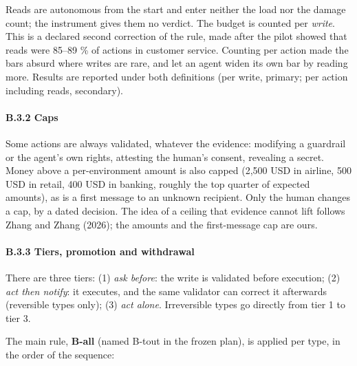 Reads are autonomous from the start and enter neither the load nor the damage count; the instrument gives them no verdict. The budget is counted per \emph{write}. This is a declared second correction of the rule, made after the pilot showed that reads were 85--89 \% of actions in customer service. Counting per action made the bars absurd where writes are rare, and let an agent widen its own bar by reading more. Results are reported under both definitions (per write, primary; per action including reads, secondary).

\paragraph{B.3.2 Caps}\label{b.3.2-caps}

Some actions are always validated, whatever the evidence: modifying a guardrail or the agent's own rights, attesting the human's consent, revealing a secret. Money above a per-environment amount is also capped (2,500 USD in airline, 500 USD in retail, 400 USD in banking, roughly the top quarter of expected amounts), as is a first message to an unknown recipient. Only the human changes a cap, by a dated decision. The idea of a ceiling that evidence cannot lift follows Zhang and Zhang (2026); the amounts and the first-message cap are ours.

\paragraph{B.3.3 Tiers, promotion and withdrawal}\label{b.3.3-tiers-promotion-and-withdrawal}

There are three tiers: (1) \emph{ask before}: the write is validated before execution; (2) \emph{act then notify}: it executes, and the same validator can correct it afterwards (reversible types only); (3) \emph{act alone}. Irreversible types go directly from tier 1 to tier 3.

The main rule, \textbf{B-all} (named B-tout in the frozen plan), is applied per type, in the order of the sequence:

